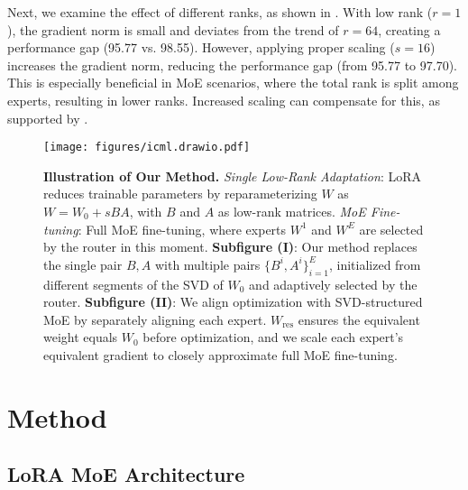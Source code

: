 Next, we examine the effect of different ranks, as shown in . With low rank (\eg \( r = 1 \)), the gradient norm is small and deviates from the trend of \( r = 64 \), creating a performance gap (95.77 vs. 98.55). However, applying proper scaling (\( s = 16 \)) increases the gradient norm, reducing the performance gap (from 95.77 to 97.70). This is especially beneficial in MoE scenarios, where the total rank is split among experts, resulting in lower ranks. Increased scaling can compensate for this, as supported by \citet{tian2024hydraloraasymmetricloraarchitecture}.

\begin{figure*}[t]
    \centering
    \texttt{[image: figures/icml.drawio.pdf]}
    \vspace{-2mm}
    \caption{
        \textbf{Illustration of Our Method.} 
        \textit{Single Low-Rank Adaptation}: LoRA reduces trainable parameters by reparameterizing \( W \) as \( W = W_0 + sBA \), with \( B \) and \( A \) as low-rank matrices. 
        \textit{MoE Fine-tuning}: Full MoE fine-tuning, where experts \( W^1 \) and \( W^E \) are selected by the router in this moment.
        \textbf{Subfigure (I)}: Our method replaces the single pair \( B, A \) with multiple pairs \( \{B^i, A^i\}_{i=1}^E \), initialized from different segments of the SVD of \( W_0 \) and adaptively selected by the router.
        \textbf{Subfigure (II)}: We align optimization with SVD-structured MoE by separately aligning each expert. \( W_{\text{res}} \) ensures the equivalent weight equals \( W_0 \) before optimization, and we scale each expert’s equivalent gradient to closely approximate full MoE fine-tuning.
    }
    \vspace{-5mm}
    \label{fig:intro}
\end{figure*}

\section{Method}

\subsection{LoRA MoE Architecture} 

